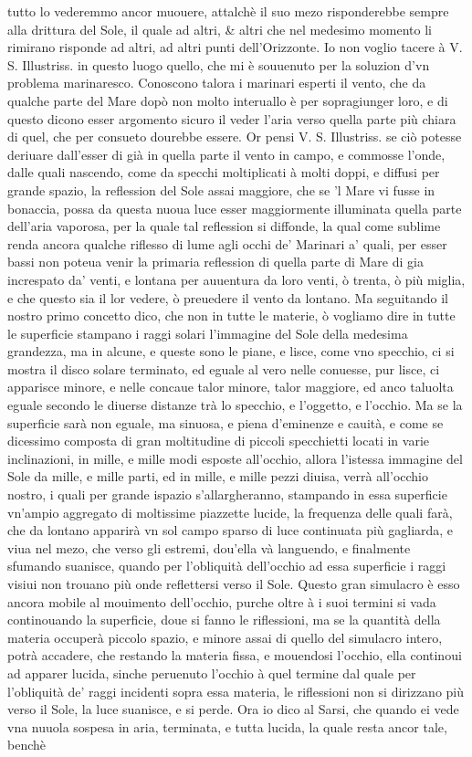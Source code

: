\documentclass[11pt,twoside,openany]{book}
\begin{document}
tutto lo vederemmo ancor muouere, attalchè il suo mezo risponderebbe sempre alla drittura del Sole, il quale ad altri, \& altri che nel medesimo momento li rimirano risponde ad altri, ad altri punti dell'Orizzonte. Io non voglio tacere à V. S. Illustriss. in questo luogo quello, che mi è souuenuto per la soluzion d'vn problema marinaresco. Conoscono talora i marinari esperti il vento, che da qualche parte del Mare dopò non molto interuallo è per sopragiunger loro, e di questo dicono esser argomento sicuro il veder l'aria verso quella parte più chiara di quel, che per consueto dourebbe essere. Or pensi V. S. Illustriss. se ciò potesse deriuare dall'esser di già in quella parte il vento in campo, e commosse l'onde, dalle quali nascendo, come da specchi moltiplicati à molti doppi, e diffusi per grande spazio, la reflession del Sole assai maggiore, che se 'l Mare vi fusse in bonaccia, possa da questa nuoua luce esser maggiormente illuminata quella parte dell'aria vaporosa, per la quale tal reflession si diffonde, la qual come sublime renda ancora qualche riflesso di lume agli occhi de' Marinari a' quali, per esser bassi non poteua venir la primaria reflession di quella parte di Mare di gia increspato da' venti, e lontana per auuentura da loro venti, ò trenta, ò più miglia, e che questo sia il lor vedere, ò preuedere il vento da lontano. Ma seguitando il nostro primo concetto dico, che non in tutte le materie, ò vogliamo dire in tutte le superficie stampano i raggi solari l'immagine del Sole della medesima grandezza, ma in alcune, e queste sono le piane, e lisce, come vno specchio, ci si mostra il disco solare terminato, ed eguale al vero nelle conuesse, pur lisce, ci apparisce minore, e nelle concaue talor minore, talor maggiore, ed anco taluolta eguale secondo le diuerse distanze trà lo specchio, e l'oggetto, e l'occhio. Ma se la superficie sarà non eguale, ma sinuosa, e piena d'eminenze e cauità, e come se dicessimo composta di gran moltitudine di piccoli specchietti locati in varie inclinazioni, in mille, e mille modi esposte all'occhio, allora l'istessa immagine del Sole da mille, e mille parti, ed in mille, e mille pezzi diuisa, verrà all'occhio nostro, i quali per grande ispazio s'allargheranno, stampando in essa superficie vn'ampio aggregato di moltissime piazzette lucide, la frequenza delle quali farà, che da lontano apparirà vn sol campo sparso di luce continuata più gagliarda, e viua nel mezo, che verso gli estremi, dou'ella và languendo, e finalmente sfumando suanisce, quando per l'obliquità dell'occhio ad essa superficie i raggi visiui non trouano più onde reflettersi verso il Sole. Questo gran simulacro è esso ancora mobile al mouimento dell'occhio, purche oltre à i suoi termini si vada continouando la superficie, doue si fanno le riflessioni, ma se la quantità della materia occuperà piccolo spazio, e minore assai di quello del simulacro intero, potrà accadere, che restando la materia fissa, e mouendosi l'occhio, ella continoui ad apparer lucida, sinche peruenuto l'occhio à quel termine dal quale per l'obliquità de' raggi incidenti sopra essa materia, le riflessioni non si dirizzano più verso il Sole, la luce suanisce, e si perde. Ora io dico al Sarsi, che quando ei vede vna nuuola sospesa in aria, terminata, e tutta lucida, la quale resta ancor tale, benchè 
\end{document}
